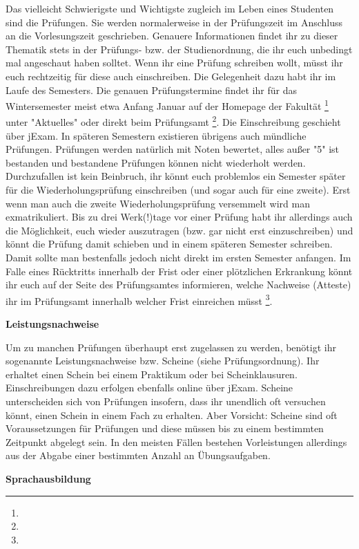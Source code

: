 Das vielleicht Schwierigste und Wichtigste zugleich im Leben eines Studenten sind die Prüfungen. Sie werden normalerweise in der Prüfungszeit im Anschluss an die Vorlesungszeit geschrieben. Genauere Informationen findet ihr zu dieser Thematik stets in der Prüfungs- bzw. der Studienordnung, die ihr euch unbedingt mal angeschaut haben solltet. Wenn ihr eine Prüfung schreiben wollt, müsst ihr euch rechtzeitig für diese auch einschreiben. Die Gelegenheit dazu habt ihr im Laufe des Semesters. Die genauen Prüfungstermine findet ihr für das Wintersemester meist etwa Anfang Januar auf der Homepage der Fakultät \footnote{} unter "Aktuelles" oder direkt beim Prüfungsamt \footnote{}. Die Einschreibung geschieht über jExam. In späteren Semestern existieren übrigens auch mündliche Prüfungen. Prüfungen werden natürlich mit Noten bewertet, alles außer "5" ist bestanden und bestandene Prüfungen können nicht wiederholt werden. Durchzufallen ist kein Beinbruch, ihr könnt euch problemlos ein Semester später für die Wiederholungsprüfung einschreiben (und sogar auch für eine zweite). Erst wenn man auch die zweite Wiederholungsprüfung versemmelt wird man exmatrikuliert. Bis zu drei Werk(!)tage vor einer Prüfung habt ihr allerdings auch die Möglichkeit, euch wieder auszutragen (bzw. gar nicht erst einzuschreiben) und könnt die Prüfung damit schieben und in einem späteren Semester schreiben. Damit sollte man bestenfalls jedoch nicht direkt im ersten Semester anfangen. Im Falle eines Rücktritts innerhalb der Frist oder einer plötzlichen Erkrankung könnt ihr euch auf der Seite des Prüfungsamtes informieren, welche Nachweise (Atteste) ihr im Prüfungsamt innerhalb welcher Frist einreichen müsst \footnote{}.

\textbf{Leistungsnachweise}

Um zu manchen Prüfungen überhaupt erst zugelassen zu werden, benötigt ihr sogenannte Leistungsnachweise bzw. Scheine (siehe Prüfungsordnung). Ihr erhaltet einen Schein bei einem Praktikum oder bei Scheinklausuren. Einschreibungen dazu erfolgen ebenfalls online über jExam. Scheine unterscheiden sich von Prüfungen insofern, dass ihr unendlich oft versuchen könnt, einen Schein in einem Fach zu erhalten. Aber Vorsicht: Scheine sind oft Voraussetzungen für Prüfungen und diese müssen bis zu einem bestimmten Zeitpunkt abgelegt sein. In den meisten Fällen bestehen Vorleistungen allerdings aus der Abgabe einer bestimmten Anzahl an Übungsaufgaben.

\textbf{Sprachausbildung}

